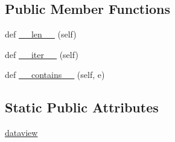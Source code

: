 \subsection*{Public Member Functions}
\begin{DoxyCompactItemize}
\item 
def \hyperlink{classnetworkx_1_1classes_1_1reportviews_1_1EdgeView_a9fe6fd609cd91b9209c747688f2a1162}{\+\_\+\+\_\+len\+\_\+\+\_\+} (self)
\item 
def \hyperlink{classnetworkx_1_1classes_1_1reportviews_1_1EdgeView_a937637471130a6dba111883296096b87}{\+\_\+\+\_\+iter\+\_\+\+\_\+} (self)
\item 
def \hyperlink{classnetworkx_1_1classes_1_1reportviews_1_1EdgeView_a73d4b8ea94558517661fc98cface81b2}{\+\_\+\+\_\+contains\+\_\+\+\_\+} (self, e)
\end{DoxyCompactItemize}
\subsection*{Static Public Attributes}
\begin{DoxyCompactItemize}
\item 
\hyperlink{classnetworkx_1_1classes_1_1reportviews_1_1EdgeView_af3b32461c8bcc6bf7f735a6534f5f681}{dataview}
\end{DoxyCompactItemize}


